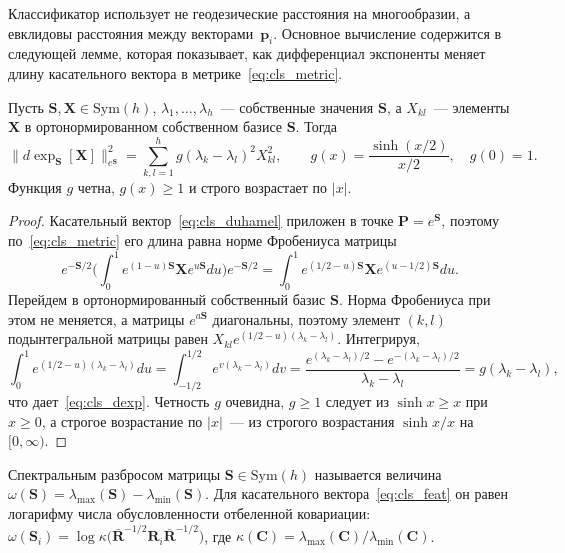 Классификатор использует не геодезические расстояния на многообразии, а евклидовы расстояния между векторами~$\mathbf{p}_i$. Основное вычисление содержится в следующей лемме, которая показывает, как дифференциал экспоненты меняет длину касательного вектора в метрике~\eqref{eq:cls_metric}.

\begin{lemma}\label{lem:cls_dexp}
Пусть $\mathbf{S}, \mathbf{X} \in \mathrm{Sym}(h)$, $\lambda_1, \ldots, \lambda_h$~--- собственные значения $\mathbf{S}$, а $X_{kl}$~--- элементы $\mathbf{X}$ в ортонормированном собственном базисе $\mathbf{S}$. Тогда
\begin{equation}\label{eq:cls_dexp}
\big\| d\exp_{\mathbf{S}}[\mathbf{X}] \big\|_{e^{\mathbf{S}}}^2 = \sum_{k,l=1}^{h} g(\lambda_k - \lambda_l)^2 X_{kl}^2,
\qquad
g(x) = \frac{\sinh(x/2)}{x/2}, \quad g(0) = 1 .
\end{equation}
Функция $g$ четна, $g(x) \geqslant 1$ и строго возрастает по $|x|$.
\end{lemma}
\begin{proof}
Касательный вектор~\eqref{eq:cls_duhamel} приложен в точке $\mathbf{P} = e^{\mathbf{S}}$, поэтому по~\eqref{eq:cls_metric} его длина равна норме Фробениуса матрицы
\begin{equation*}
e^{-\mathbf{S}/2} \Big( \int_0^1 e^{(1-u)\mathbf{S}} \mathbf{X} e^{u\mathbf{S}} du \Big) e^{-\mathbf{S}/2} = \int_0^1 e^{(1/2-u)\mathbf{S}} \mathbf{X} e^{(u-1/2)\mathbf{S}} du .
\end{equation*}
Перейдем в ортонормированный собственный базис $\mathbf{S}$. Норма Фробениуса при этом не меняется, а матрицы $e^{a\mathbf{S}}$ диагональны, поэтому элемент $(k,l)$ подынтегральной матрицы равен $X_{kl} e^{(1/2-u)(\lambda_k - \lambda_l)}$. Интегрируя,
\begin{equation*}
\int_0^1 e^{(1/2-u)(\lambda_k - \lambda_l)} du = \int_{-1/2}^{1/2} e^{v(\lambda_k - \lambda_l)} dv = \frac{e^{(\lambda_k-\lambda_l)/2} - e^{-(\lambda_k-\lambda_l)/2}}{\lambda_k - \lambda_l} = g(\lambda_k - \lambda_l),
\end{equation*}
что дает~\eqref{eq:cls_dexp}. Четность $g$ очевидна, $g \geqslant 1$ следует из $\sinh x \geqslant x$ при $x \geqslant 0$, а строгое возрастание по $|x|$~--- из строгого возрастания $\sinh x / x$ на $[0, \infty)$.
\end{proof}

Спектральным разбросом матрицы $\mathbf{S} \in \mathrm{Sym}(h)$ называется величина $\omega(\mathbf{S}) = \lambda_{\max}(\mathbf{S}) - \lambda_{\min}(\mathbf{S})$. Для касательного вектора~\eqref{eq:cls_feat} он равен логарифму числа обусловленности отбеленной ковариации: $\omega(\mathbf{S}_i) = \log\kappa\big(\bar{\mathbf{R}}^{-1/2}\mathbf{R}_i\bar{\mathbf{R}}^{-1/2}\big)$, где $\kappa(\mathbf{C}) = \lambda_{\max}(\mathbf{C})/\lambda_{\min}(\mathbf{C})$.

